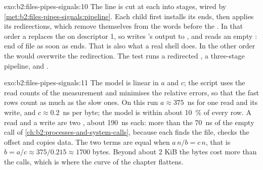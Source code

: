 \begin{solution}{exo:b2:files-pipes-signals:10}
The line is cut at each \code{|} into stages, wired by \cref{met:b2:files-pipes-signals:pipeline}. Each child first
installs its  ends, then applies its redirections, which remove themselves from the words before the . In
that order a \code{>} replaces the  on descriptor 1, so  writes 's output to ,
and  reads an empty : end of file as soon as  ends. That is also what a real shell does. In the
other order the  would overwrite the redirection. The test runs a redirected , a three-stage pipeline,
and .
\end{solution}

\begin{solution}{exo:b2:files-pipes-signals:11}
The model is linear in $a$ and $c$; the script uses the read counts of the measurement and minimises the relative
errors, so that the fast rows count as much as the slow ones. On this run $a \approx 375$~ns for one read and its
write, and $c \approx 0.2$~ns per byte; the model is within about 10~\% of every row. A read and a write are two
, about 190~ns each: more than the 70~ns of the empty call of \cref{ch:b2:processes-and-system-calls},
because each finds the file, checks the offset and copies data. The two terms are equal when $a\,n/b = c\,n$, that is
$b = a / c \approx 375 / 0.215 \approx 1700$ bytes. Beyond about 2 KiB the bytes cost more than the calls, which is
where the curve of the chapter flattens.
\end{solution}

